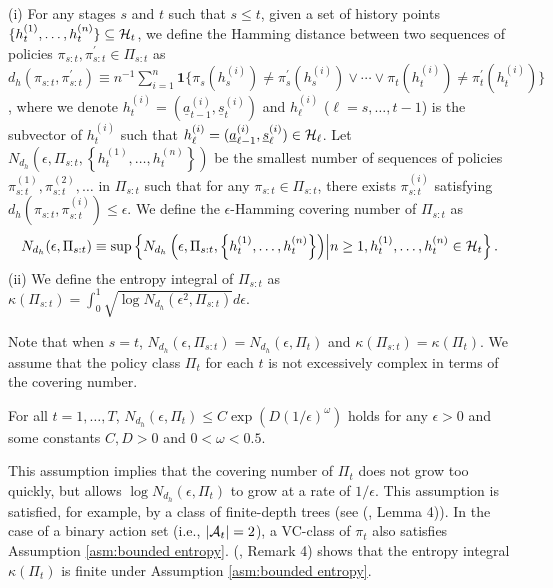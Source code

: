 \medskip{}

\begin{definition}
(i) For any stages $s$ and $t$ such that $s \leq t$, given a set of history points $\{h_{t}^{(1)},\ldots,h_{t}^{(n)}\} \subseteq \mathcal{H}_{t}$, we define the Hamming distance between two sequences of policies  $\pi_{s:t}, \pi_{s:t}^{\prime} \in \Pi_{s:t}$ as $d_{h}(\pi_{s:t},\pi_{s:t}^{\prime}) \equiv n^{-1}\sum_{i=1}^{n}\mathbf{1}\{\pi_s(h_{s}^{(i)})\neq \pi_{s}^{\prime}(h_{s}^{(i)}) \vee \cdots \vee \pi_t(h_{t}^{(i)})\neq \pi_{t}^{\prime}(h_{t}^{(i)})\}$,
where we denote $h_{t}^{(i)} = (\underline{a}_{t-1}^{(i)},\underline{s}_{t}^{(i)})$ and $h_{\ell}^{(i)}$ ($\ell =s,\ldots,t-1$) is the subvector of $h_{t}^{(i)}$ such that $h_{\ell}^{(i)} = (\underline{a}_{\ell-1}^{(i)},\underline{s}_{\ell}^{(i)}) \in \mathcal{H}_{\ell}$. 
Let $N_{d_h}\left(\epsilon,\Pi_{s:t},\left\{h_{t}^{(1)},\ldots,h_{t}^{(n)}\right\}\right)$ be the smallest number of sequences of policies $\pi_{s:t}^{(1)},\pi_{s:t}^{(2)},\ldots$ in $\Pi_{s:t}$ such that for any $\pi_{s:t} \in \Pi_{s:t}$, there exists $\pi_{s:t}^{(i)}$ satisfying $d_h(\pi_{s:t},\pi_{s:t}^{(i)}) \leq \epsilon$.
We define the $\epsilon$-Hamming covering number of $\Pi_{s:t}$ as
\begin{align*}
    N_{d_h}(\epsilon,\Pi_{s:t})  \equiv  \sup\left\{N_{d_h}\left(\epsilon,\Pi_{s:t},\left\{h_{t}^{(1)},\ldots,h_{t}^{(n)}\right\}\right)\middle| n \geq 1, h_{t}^{(1)},\ldots,h_{t}^{(n)} \in \mathcal{H}_t\right\}.
\end{align*}
(ii) We define the entropy integral of $\Pi_{s:t}$ as $\kappa(\Pi_{s:t})= \int_{0}^{1}\sqrt{\log N_{d_h}\left(\epsilon^2,\Pi_{s:t}\right)}d\epsilon$.
\end{definition}

\medskip{}

Note that when $s=t$, $N_{d_h}(\epsilon,\Pi_{s:t}) = N_{d_h}(\epsilon,\Pi_t)$ and $\kappa(\Pi_{s:t}) = \kappa(\Pi_t)$. 
We assume that the policy class $\Pi_t$ for each $t$ is not excessively complex in terms of the covering number.
\medskip{}

\begin{assumption}[Complexity of $\Pi_t$]\label{asm:bounded entropy}
For all $t=1,\ldots,T$, $N_{d_h}(\epsilon,\Pi_{t}) \leq C\exp(D(1/\epsilon)^{\omega})$ holds for any $\epsilon>0$ and some constants $C,D>0$ and $0<\omega<0.5$.
\end{assumption}

\medskip{}

This assumption implies that the covering number of $\Pi_t$ does not grow too quickly, but allows $\log N_{d_h}(\epsilon,\Pi_{t})$ to grow at a rate of  $1/\epsilon$.
This assumption is satisfied, for example, by a class of finite-depth trees (see \citeauthor{zhou2022offline} (\citeyear{zhou2022offline}, Lemma 4)). In the case of a binary action set (i.e., $|\mathcal{A}_t|=2$), a VC-class of $\pi_{t}$ also satisfies Assumption \ref{asm:bounded entropy}. 
\citeauthor{zhou2022offline} (\citeyear{zhou2022offline}, Remark 4) shows that the entropy integral $\kappa(\Pi_t)$ is finite under Assumption \ref{asm:bounded entropy}. 

